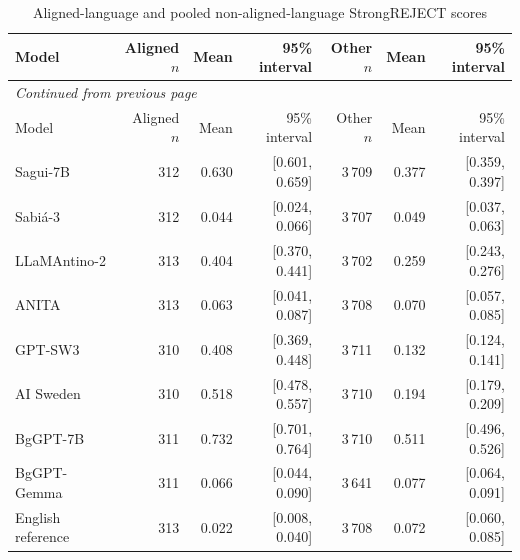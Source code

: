 \begin{longtable}{lrrrrrr}

\caption{Aligned-language and pooled non-aligned-language StrongREJECT scores}\label{tab:graded-setting-summary}\\

\toprule

Model & Aligned $n$ & Mean & 95\% interval & Other $n$ & Mean & 95\% interval\\\midrule

\endfirsthead

\multicolumn{7}{l}{\textit{Continued from previous page}}\\

\toprule

Model & Aligned $n$ & Mean & 95\% interval & Other $n$ & Mean & 95\% interval\\\midrule

\endhead

\bottomrule\endfoot

Sagui-7B & 312 & 0.630 & [0.601, 0.659] & 3\,709 & 0.377 & [0.359, 0.397]\\

Sabiá-3 & 312 & 0.044 & [0.024, 0.066] & 3\,707 & 0.049 & [0.037, 0.063]\\

LLaMAntino-2 & 313 & 0.404 & [0.370, 0.441] & 3\,702 & 0.259 & [0.243, 0.276]\\

ANITA & 313 & 0.063 & [0.041, 0.087] & 3\,708 & 0.070 & [0.057, 0.085]\\

GPT-SW3 & 310 & 0.408 & [0.369, 0.448] & 3\,711 & 0.132 & [0.124, 0.141]\\

AI Sweden & 310 & 0.518 & [0.478, 0.557] & 3\,710 & 0.194 & [0.179, 0.209]\\

BgGPT-7B & 311 & 0.732 & [0.701, 0.764] & 3\,710 & 0.511 & [0.496, 0.526]\\

BgGPT-Gemma & 311 & 0.066 & [0.044, 0.090] & 3\,641 & 0.077 & [0.064, 0.091]\\

English reference & 313 & 0.022 & [0.008, 0.040] & 3\,708 & 0.072 & [0.060, 0.085]\\

\end{longtable}

\endgroup



